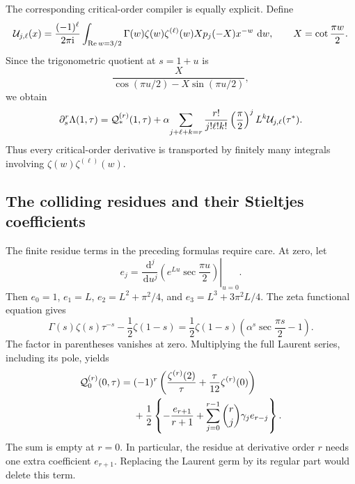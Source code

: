 \documentclass[11pt,letterpaper]{article}
\numberwithin{equation}{section}
\theoremstyle{definition}
\theoremstyle{remark}
\DeclareMathOperator{\Ree}{Re}
\newcommand{\ii}{\mathrm i}
\newcommand{\dd}{\,\mathrm d}
\begin{document}
The corresponding critical-order compiler is equally explicit.
Define
\begin{equation}\label{eq:Umod}
 {\cal U}_{j,\ell}(x)=
 \frac{(-1)^\ell}{2\pi\ii}
 \int_{\Ree w=3/2}
    \Gamma(w)\zeta(w)\zeta^{(\ell)}(w)
    Xp_j(-X)x^{-w}\,\dd w,\qquad
    X=\cot\frac{\pi w}{2}.
\end{equation}
Since the trigonometric quotient at \(s=1+u\) is
\[
 \frac{X}{\cos(\pi u/2)-X\sin(\pi u/2)},
\]
we obtain
\begin{equation}\label{eq:critical-mod-jets}
 \partial_s^r\Lambda(1,\tau)
  ={\cal Q}_*^{(r)}(1,\tau)
   +\alpha\!
    \sum_{j+\ell+k=r}\frac{r!}{j!\ell!k!}
          \left(\frac{\pi}{2}\right)^j L^k
                                  {\cal U}_{j,\ell}(\tau^*).
\end{equation}
Thus every critical-order derivative is transported by finitely
many integrals involving \(\zeta(w)\zeta^{(\ell)}(w)\).

\subsection{The colliding residues and their Stieltjes coefficients}

The finite residue terms in the preceding formulas require care.
At zero, let
\begin{equation}\label{eq:mod-e}
 e_j=\left.\frac{\dd^j}{\dd u^j}
                 \left(e^{Lu}\sec\frac{\pi u}{2}\right)\right|_{u=0}.
\end{equation}
Then \(e_0=1\), \(e_1=L\),
\(e_2=L^2+\pi^2/4\), and
\(e_3=L^3+3\pi^2L/4\). The zeta functional equation gives
\[
 \Gamma(s)\zeta(s)\tau^{-s}-\frac12\zeta(1-s)
 =\frac12\zeta(1-s)
           \left(\alpha^s\sec\frac{\pi s}{2}-1\right).
\]
The factor in parentheses vanishes at zero. Multiplying the
full Laurent series, including its pole, yields
\begin{equation}\label{eq:Qzero-jets}
 \begin{split}
 {\cal Q}_0^{(r)}(0,\tau)
 ={}&(-1)^r\left(\frac{\zeta^{(r)}(2)}{\tau}
                  +\frac{\tau}{12}\zeta^{(r)}(0)\right)\\
 &+\frac12\left\{-\frac{e_{r+1}}{r+1}
        +\sum_{j=0}^{r-1}\binom rj\gamma_j e_{r-j}\right\}.
 \end{split}
\end{equation}
The sum is empty at \(r=0\). In particular, the residue at
derivative order \(r\) needs one extra coefficient \(e_{r+1}\).
Replacing the Laurent germ by its regular part would delete this
term.
\end{document}

